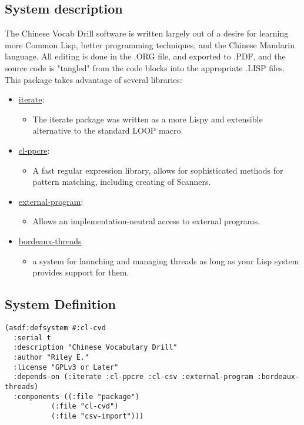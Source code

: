 \documentclass[11pt]{article}
\begin{document}
\subsection{System description}
\label{sec-1-1}
The Chinese Vocab Drill software is written largely out of a desire for learning
more Common Lisp, better programming techniques, and the Chinese Mandarin
language. All editing is done in the .ORG file, and exported to .PDF, and the
source code is "tangled" from the code blocks into the appropriate .LISP
files. This package takes advantage of several libraries:
\begin{itemize}
\item \href{http://common-lisp.net/project/iterate/}{iterate}:
\begin{itemize}
\item The iterate package was written as a more Lispy and extensible alternative to
the standard LOOP macro.
\end{itemize}
\item \href{http://weitz.de/cl-ppcre/}{cl-ppcre}:
\begin{itemize}
\item A fast regular expression library, allows for sophisticated methods for
pattern matching, including creating of Scanners.
\end{itemize}
\item \href{http://common-lisp.net/project/external-program/}{external-program}:
\begin{itemize}
\item Allows an implementation-neutral access to external programs.
\end{itemize}
\item \href{http://common-lisp.net/project/bordeaux-threads/}{bordeaux-threads}
\begin{itemize}
\item a system for launching and managing threads as long as your Lisp system
provides support for them.
\end{itemize}
\end{itemize}

\subsection{System Definition}
\label{sec-1-2}
\begin{verbatim}
(asdf:defsystem #:cl-cvd
  :serial t
  :description "Chinese Vocabulary Drill"
  :author "Riley E."
  :license "GPLv3 or Later"
  :depends-on (:iterate :cl-ppcre :cl-csv :external-program :bordeaux-threads)
  :components ((:file "package")
	       (:file "cl-cvd")
	       (:file "csv-import")))
\end{verbatim}
\end{document}
